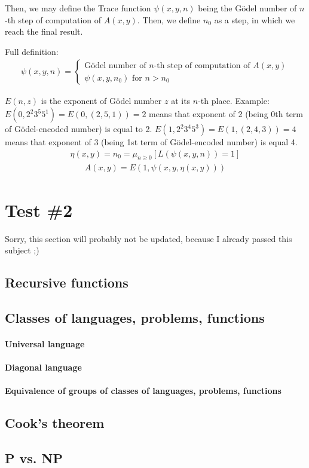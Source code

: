 \documentclass{article}
\begin{document}
Then, we may define the Trace function $\psi(x,y,n)$ being the Gödel number of $n$-th step of
computation of $A(x,y)$. Then, we define $n_0$ as a step, in which we reach the final result.

Full definition:
\begin{gather*}
\psi(x,y,n) = \begin{cases}
\mbox{Gödel number of } n\mbox{-th step of computation of } A(x,y) \\
\psi(x,y,n_0) \mbox{ for } n > n_0
\end{cases}
\end{gather*}

$E(n,z)$ is the exponent of Gödel number $z$ at its $n$-th place. Example: $E(0,2^2 3^5 5^1) =
E(0,(2,5,1)) = 2$ means that exponent of 2 (being 0th term of Gödel-encoded number) is equal to 2.
$E(1,2^2 3^4 5^3) = E(1,(2,4,3)) = 4$ means that exponent of 3 (being 1st term of Gödel-encoded
number) is equal 4.
\begin{gather*}
\eta(x,y) = n_0 = \mu_{n \geq 0} \left[ L(\psi(x,y,n)) = 1 \right]
\end{gather*}
\begin{gather*}
A(x,y) = E(1,\psi(x,y,\eta(x,y)))
\end{gather*}

\pagebreak[4]

\section{Test \#2}

Sorry, this section will probably not be updated, because I already passed this subject ;)

\subsection{Recursive functions}

\subsection{Classes of languages, problems, functions}

\paragraph{Universal language}

\paragraph{Diagonal language}

\paragraph{Equivalence of groups of classes of languages, problems, functions}

\subsection{Cook's theorem}

\subsection{P vs. NP}
\end{document}
